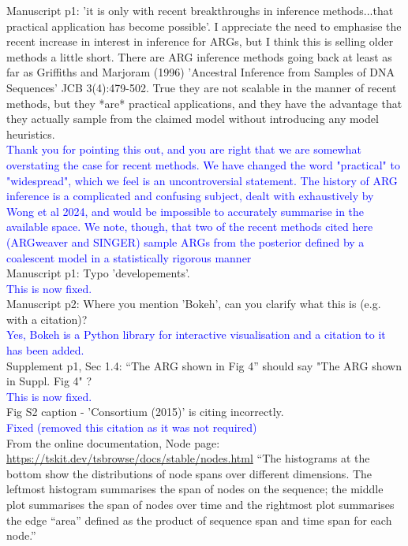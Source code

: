 \documentclass{article}
\begin{document}
Manuscript p1: 'it is only with recent breakthroughs in inference methods...that practical application 
has become possible'. I appreciate the need to emphasise the recent increase in interest in inference for ARGs, 
but I think this is selling older methods a little short. There are ARG inference methods going back at least 
as far as Griffiths and Marjoram (1996) 'Ancestral Inference from Samples of DNA Sequences' JCB 3(4):479-502. 
True they are not scalable in the manner of recent methods, but they *are* practical applications, and they have 
the advantage that they actually sample from the claimed model without introducing any model heuristics.\\
\textcolor{blue}{Thank you for pointing this out, and you are right that we are somewhat overstating the 
case for recent methods. We have changed the word "practical" to "widespread", which we feel is an uncontroversial 
statement. The history of ARG inference is a complicated and confusing subject, dealt with exhaustively by 
Wong et al 2024, and would be impossible to accurately summarise in the available space. We note, though, 
that two of the recent methods cited here (ARGweaver and SINGER) sample ARGs from the posterior defined by a 
coalescent model in a statistically rigorous manner}\\

Manuscript p1: Typo 'developements'.\\
\textcolor{blue}{This is now fixed.}\\

Manuscript p2: Where you mention 'Bokeh', can you clarify what this is (e.g. with a citation)?\\
\textcolor{blue}{Yes, Bokeh is a Python library for interactive visualisation and a citation to it 
has been added.}\\

Supplement p1, Sec 1.4: ``The ARG shown in Fig 4'' should say "The ARG shown in Suppl. Fig 4" ?\\
\textcolor{blue}{This is now fixed.}\\

Fig S2 caption - 'Consortium (2015)' is citing incorrectly.\\
\textcolor{blue}{Fixed (removed this citation as it was not required)}\\

From the online documentation, Node page: \url{https://tskit.dev/tsbrowse/docs/stable/nodes.html}
``The histograms at the bottom show the distributions of node spans over different dimensions. 
The leftmost histogram summarises the span of nodes on the sequence; the middle plot summarises 
the span of nodes over time and the rightmost plot summarises the edge “area” defined as the product 
of sequence span and time span for each node.''
\end{document}
